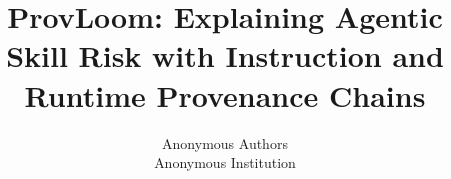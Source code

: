 \documentclass[letterpaper,twocolumn,10pt]{article}
\begin{document}
\date{}

\title{\Large \bf ProvLoom: Explaining Agentic Skill Risk with Instruction and Runtime Provenance Chains}

\author{
{\rm Anonymous Authors}\\
Anonymous Institution
}

\maketitle
\thispagestyle{empty}













{\footnotesize


}
\end{document}
